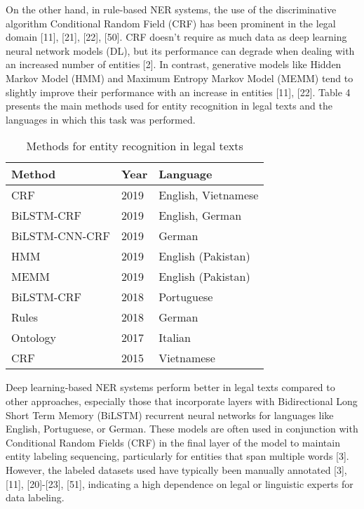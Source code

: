 On the other hand, in rule-based NER systems, the use of the discriminative algorithm Conditional Random Field (CRF) has been prominent in the legal domain [11], [21], [22], [50]. CRF doesn't require as much data as deep learning neural network models (DL), but its performance can degrade when dealing with an increased number of entities [2]. In contrast, generative models like Hidden Markov Model (HMM) and Maximum Entropy Markov Model (MEMM) tend to slightly improve their performance with an increase in entities [11], [22]. Table 4 presents the main methods used for entity recognition in legal texts and the languages in which this task was performed.

\begin{center}
    \begin{table}[h]
        \centering%
        \caption{Methods for entity recognition in legal texts}
        \label{tab:legal-ner}
        \begin{tabular}{|l|l|l|}
            \hline
            \textbf{Method} & \textbf{Year} & \textbf{Language}   \\ \hline
            CRF             & 2019          & English, Vietnamese \\ \hline
            BiLSTM-CRF      & 2019          & English, German     \\ \hline
            BiLSTM-CNN-CRF  & 2019          & German              \\ \hline
            HMM             & 2019          & English (Pakistan)  \\ \hline
            MEMM            & 2019          & English (Pakistan)  \\ \hline
            BiLSTM-CRF      & 2018          & Portuguese          \\ \hline
            Rules           & 2018          & German              \\ \hline
            Ontology        & 2017          & Italian             \\ \hline
            CRF             & 2015          & Vietnamese          \\ \hline
        \end{tabular}
    \end{table}
\end{center}

Deep learning-based NER systems perform better in legal texts compared to other approaches, especially those that incorporate layers with Bidirectional Long Short Term Memory (BiLSTM) recurrent neural networks for languages like English, Portuguese, or German. These models are often used in conjunction with Conditional Random Fields (CRF) in the final layer of the model to maintain entity labeling sequencing, particularly for entities that span multiple words [3]. However, the labeled datasets used have typically been manually annotated [3], [11], [20]-[23], [51], indicating a high dependence on legal or linguistic experts for data labeling.

